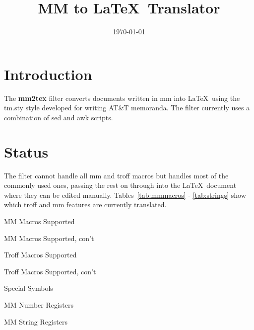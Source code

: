 \newcommand{\X}[1]{{#1}\index{{#1}}}
\title{MM to \LaTeX\ Translator}



\date{\today}
\organizationalapproval
\markproprietary


\makehead
\makeabstract
\section{Introduction}
The {\bf mm2tex} filter converts documents written in mm into \LaTeX\ using
the tm.sty style developed for writing AT\&T memoranda.  The filter
currently uses a combination of sed and awk scripts. 
\section{Status}
The filter
cannot handle all mm and troff macros but handles most of the commonly
used ones, passing the rest on through into the \LaTeX\ document where
they can be edited manually. Tables~\ref{tab:mmmacros} -
\ref{tab:strings} show which troff and mm features are currently translated.
\begin{table}[htp]

\caption{\label{tab:mmmacros}MM Macros Supported}
\end{table}
\begin{table}[htp]

\caption{\label{tab:mmmacros2}MM Macros Supported, con't}
\end{table}
\begin{table}[htp]

\caption{\label{tab:troffmacros}Troff Macros Supported}
\end{table}
\begin{table}[htp]

\caption{\label{tab:troffmacros2}Troff Macros Supported, con't}
\end{table}
\begin{table}[htp]

\caption{\label{tab:specialsymb}Special Symbols}
\end{table}
\begin{table}[htp]

\caption{\label{tab:numreg}MM Number Registers}
\end{table}
\begin{table}[htp]

\caption{\label{tab:strings}MM String Registers}
\end{table}
